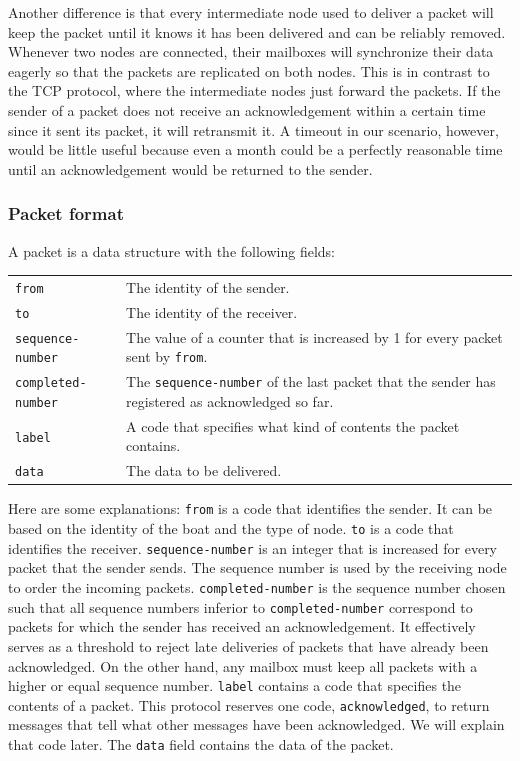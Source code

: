 \documentclass{article}
\begin{document}
\begin{itemize}
\begin{itemize}
Another difference is that every intermediate node used to deliver a packet will keep the packet until it knows it has been delivered and can be reliably removed. Whenever two nodes are connected, their mailboxes will synchronize their data eagerly so that the packets are replicated on both nodes. This is in contrast to the TCP protocol, where the intermediate nodes just forward the packets. If the sender of a packet does not receive an acknowledgement within a certain time since it sent its packet, it will retransmit it. A timeout in our scenario, however, would be little useful because even a month could be a perfectly reasonable time until an acknowledgement would be returned to the sender.

\subsubsection{Packet format}
A packet is a data structure with the following fields:

\begin{tabular}{l p{30em}}
  \texttt{from} & The identity of the sender. \\
  \texttt{to} & The identity of the receiver. \\
  \texttt{sequence-number} & The value of a counter that is increased by 1 for every packet sent by \texttt{from}. \\

  \texttt{completed-number} & The \texttt{sequence-number} of the last packet that the sender has registered as acknowledged so far.\\
  \texttt{label} & A code that specifies what kind of contents the packet contains.\\
  \texttt{data} & The data to be delivered.
\end{tabular}

Here are some explanations: \texttt{from} is a code that identifies the sender. It can be based on the identity of the boat and the type of node. \texttt{to} is a code that identifies the receiver. \texttt{sequence-number} is an integer that is increased for every packet that the sender sends. The sequence number is used by the receiving node to order the incoming packets. \texttt{completed-number} is the sequence number chosen such that all sequence numbers inferior to \texttt{completed-number} correspond to packets for which the sender has received an acknowledgement. It effectively serves as a threshold to reject late deliveries of packets that have already been acknowledged. On the other hand, any mailbox must keep all packets with a higher or equal sequence number. \texttt{label} contains a code that specifies the contents of a packet. This protocol reserves one code, \texttt{acknowledged}, to return messages that tell what other messages have been acknowledged. We will explain that code later. The \texttt{data} field contains the data of the packet.


\end{itemize}
\end{itemize}
\end{document}
